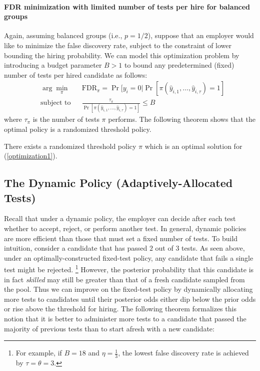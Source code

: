 \paragraph*{FDR minimization with limited number of tests per hire for balanced groups}
Again, assuming balanced groups (i.e., $p=1/2$),
suppose that an employer would like 
to minimize the false discovery rate, 
subject to the constraint of lower bounding the hiring probability.
We can model this optimization problem 
by introducing a budget parameter $B>1$ 
to bound any predetermined (fixed) number of tests 
per hired candidate as follows:
\begin{equation}\label{optimization1}
\begin{aligned}
& \arg\min_{\pi}
& & \text{FDR}_{\pi}=\Pr[y_i=0|\Pr[\pi(\hat{y}_{i,1},\dots,\hat{y}_{i,\tau}) =1] \\
& \text{subject to}
& & \frac{\tau_\pi}{ \Pr[\pi(\hat{y}_{i,1},\dots,\hat{y}_{i,\tau}) =1]}\leq B
\end{aligned}
\end{equation}
where $\tau_\pi$ is the number of tests $\pi$ performs.
The following theorem shows that the optimal policy is a randomized threshold policy.
\begin{theorem}\label{thm:minFPwithBudget}
There exists a randomized threshold policy $\pi$ 
which is an optimal solution for (\ref{optimization1}).
\end{theorem}
\subsection{The Dynamic Policy (Adaptively-Allocated Tests)}
Recall that under a dynamic policy, 
the employer can decide after each test 
whether to accept, reject, or perform another test.
In general, dynamic policies are more efficient 
than those that must set a fixed number of tests. 
To build intuition,
consider a candidate that has passed $2$ out of $3$ tests.
As seen above, under an optimally-constructed fixed-test policy,
any candidate that fails a single test might be rejected.
\footnote{For example, if $B=18$ and $\eta=\frac{1}{3}$,
the lowest false discovery rate is achieved by $\tau=\theta=3$.}
However, the posterior probability 
that this candidate is in fact \emph{skilled}
may still be greater than that of a fresh candidate sampled from the pool.
Thus we can improve on the fixed-test policy by dynamically
allocating more tests to candidates 
until their posterior odds either 
dip below the prior odds or rise above the threshold for hiring.
%
The following theorem formalizes this notion
that it is better to administer more tests 
to a candidate that passed the majority of previous tests 
than to start afresh with a new candidate:


